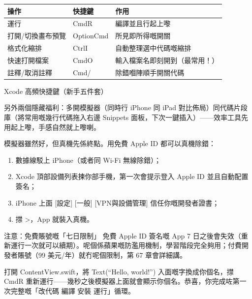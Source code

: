 \begin{center}
\begin{tabularx}{\linewidth}{|X|X|X|}
\hline
\textbf{操作} & \textbf{快捷鍵} & \textbf{作用} \tabularnewline
\hline
運行 & CmdR & 編譯並且行起上嚟 \tabularnewline
打開/切換畫布預覽 & OptionCmd & 所見即所得嘅開關 \tabularnewline
格式化縮排 & CtrlI & 自動整理選中代碼嘅縮排 \tabularnewline
快速打開檔案 & CmdO & 輸入檔案名即刻開到（最常用！） \tabularnewline
註釋/取消註釋 & Cmd/ & 除錯嗰陣順手開關代碼 \tabularnewline
\hline
\end{tabularx}
\end{center}

\begin{center}\small\color{gray}Xcode 高頻快捷鍵（新手五件套）\end{center}

另外兩個隱藏福利：多開模擬器（同時行 iPhone 同 iPad 對比佈局）同代碼片段庫（將常用嘅幾行代碼拖入右邊 Snippets 面板，下次一鍵插入）——效率工具先用起上嚟，手感自然就上嚟喇。


模擬器雖然好，但真機先係終點。用免費 Apple ID 都可以真機除錯：

\begin{enumerate}
  \item 數據線駁上 iPhone（或者同 Wi-Fi 無線除錯）；
  \item Xcode 頂部設備列表揀你部手機，第一次會提示登入 Apple ID 並且自動配置簽名；
  \item iPhone 上面 [設定] [一般] [VPN與設備管理] 信任你嘅開發者證書；
  \item 㩒 >，App 就裝入真機。
\end{enumerate}

\begin{tcbwarn}{注意：免費賬號嘅「七日限制」}
免費 Apple ID 簽名嘅 App 7 日之後會失效（重新運行一次就可以續期）。呢個係蘋果嘅防濫用機制，學習階段完全夠用；付費開發者賬號（99 美元/年）就冇呢個限制，第 67 章會詳細講。

\end{tcbwarn}



打開 ContentView.swift，將 Text(“Hello, world!”) 入面嘅字換成你個名，㩒 CmdR 重新運行——幾秒之後模擬器上面就會顯示你個名。恭喜，你完成咗第一次完整嘅「改代碼 編譯 安裝 運行」循環。

